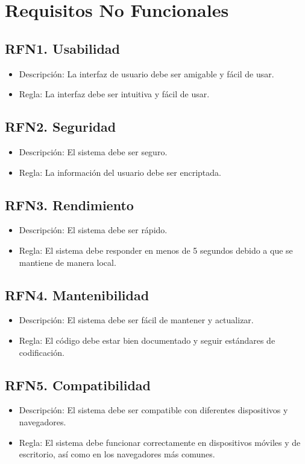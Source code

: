 \documentclass{article}
\begin{document}
\newpage
\section{Requisitos No Funcionales}

\subsection{RFN1. Usabilidad}
\begin{itemize}
    \item Descripción: La interfaz de usuario debe ser amigable y fácil de usar.
    \item Regla: La interfaz debe ser intuitiva y fácil de usar.
\end{itemize}

\subsection{RFN2. Seguridad}
\begin{itemize}
    \item Descripción: El sistema debe ser seguro.
    \item Regla: La información del usuario debe ser encriptada.
\end{itemize}

\subsection{RFN3. Rendimiento}
\begin{itemize}
    \item Descripción: El sistema debe ser rápido.
    \item Regla: El sistema debe responder en menos de 5 segundos debido a que se mantiene de manera local.
\end{itemize}

\subsection{RFN4. Mantenibilidad}
\begin{itemize}
    \item Descripción: El sistema debe ser fácil de mantener y actualizar.
    \item Regla: El código debe estar bien documentado y seguir estándares de codificación.
\end{itemize}

\subsection{RFN5. Compatibilidad}
\begin{itemize}
    \item Descripción: El sistema debe ser compatible con diferentes dispositivos y navegadores.
    \item Regla: El sistema debe funcionar correctamente en dispositivos móviles y de escritorio, así como en los navegadores más comunes.
\end{itemize}
\end{document}
